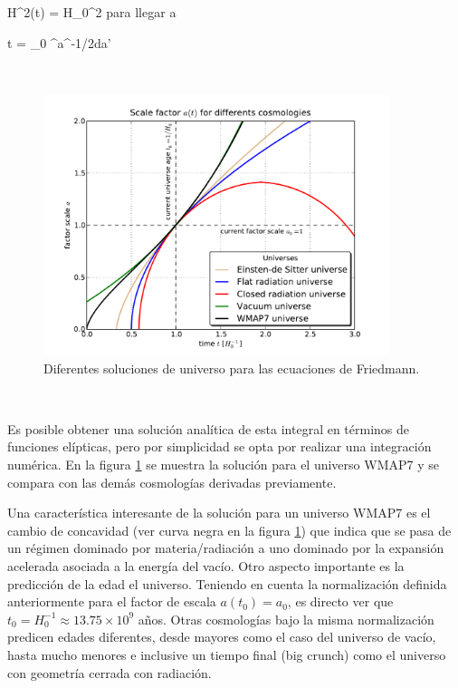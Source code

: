 { H^2(t) = H_0^2  }
para llegar a


{ t = \int _0 ^{a}^{-1/2}da' }

\
\begin{figure}[htbp]
	\centering
	\includegraphics[width=0.9\textwidth]
	{./figures/2_theoretical_framework/Friedmann_Solution.pdf}

	\caption{\small{Diferentes soluciones de universo para las ecuaciones
	de Friedmann.}}
	
	\label{fig:Cosmologies}
\end{figure}
\

Es posible obtener una solución analítica de esta integral en términos de 
funciones elípticas, pero por simplicidad se opta por realizar una 
integración numérica. En la figura \ref{fig:Cosmologies} se muestra la 
solución para el universo WMAP7 y se compara con las demás cosmologías 
derivadas previamente.


Una característica interesante de la solución para un universo WMAP7 es
el cambio de concavidad (ver curva negra en la figura \ref{fig:Cosmologies})
que indica que se pasa de un régimen dominado por materia/radiación a uno 
dominado por la expansión acelerada asociada a la energía del vacío. 
Otro aspecto importante es la predicción de la edad el universo. Teniendo 
en cuenta la normalización definida anteriormente para el factor de escala 
$a(t_0) = a_0$, es directo ver que $t_0 = H_0^{-1} \approx 13.75 \times 10^9$ 
años. Otras cosmologías bajo la misma normalización predicen edades
diferentes, desde mayores como el caso del universo de vacío, hasta mucho 
menores e inclusive un tiempo final (big crunch) como el universo con 
geometría cerrada con radiación.


